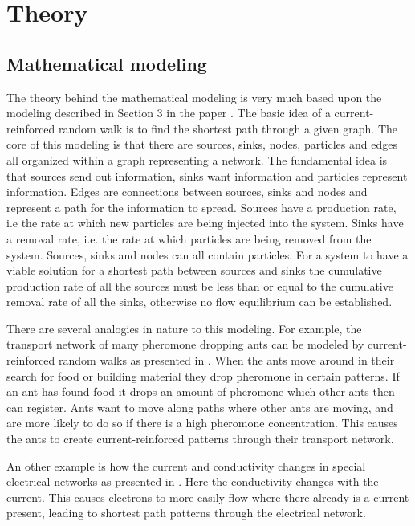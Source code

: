 \section{Theory}
\label{sec:theory}

\subsection{Mathematical modeling}
The theory behind the mathematical modeling is very much based upon the modeling described in Section 3 in the paper \cite{Current}. The basic idea of a current-reinforced random walk is to find the shortest path through a given graph. The core of this modeling is that there are sources, sinks, nodes, particles and edges all organized within a graph representing a network. The fundamental idea is that sources send out information, sinks want information and particles represent information. Edges are connections between sources, sinks and nodes and represent a path for the information to spread. Sources have a production rate, i.e the rate at which new particles are being injected into the system. Sinks have a removal rate, i.e. the rate at which particles are being removed from the system. Sources, sinks and nodes can all contain particles. For a system to have a viable solution for a shortest path between sources and sinks the cumulative production rate of all the sources must be less than or equal to the cumulative removal rate of all the sinks, otherwise no flow equilibrium can be established.

There are several analogies in nature to this modeling. For example, the transport network of many pheromone dropping ants can be modeled by current-reinforced random walks as presented in \cite{Schweitzer1997153}. When the ants move around in their search for food or building material they drop pheromone in certain patterns. If an ant has found food it drops an amount of pheromone which other ants then can register. Ants want to move along paths where other ants are moving, and are more likely to do so if there is a high pheromone concentration. This causes the ants to create current-reinforced patterns through their transport network.

An other example is how the current and conductivity changes in special electrical networks as presented in \cite{Doyle}. Here the conductivity changes with the current. This causes electrons to more easily flow where there already is a current present, leading to shortest path patterns through the electrical network. 


